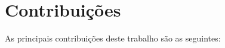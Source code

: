 








\section{Contribuições}
\label{sec:contribucoes}
As principais contribuições deste trabalho são as seguintes:

